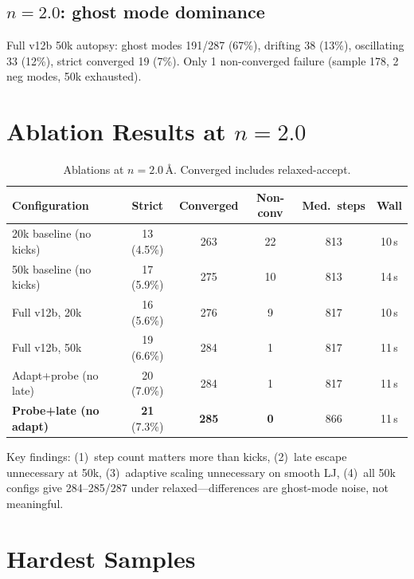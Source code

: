 \documentclass[11pt,a4paper]{article}
\theoremstyle{definition}
\begin{document}
\subsection{$n{=}2.0$: ghost mode dominance}

Full v12b 50k autopsy: ghost modes 191/287 (67\%), drifting 38 (13\%),
oscillating 33 (12\%), strict converged 19 (7\%).
Only 1 non-converged failure (sample 178, 2 neg modes, 50k exhausted).

\section{Ablation Results at $n{=}2.0$}
\label{app:ablations}

\begin{table}[h]
\centering\small
\caption{Ablations at $n{=}2.0$\,\AA.  Converged includes relaxed-accept.}
\begin{tabular}{lccccc}
\toprule
Configuration & Strict & Converged & Non-conv & Med.\ steps & Wall \\
\midrule
20k baseline (no kicks) & 13 (4.5\%) & 263 & 22 & 813 & 10\,s \\
50k baseline (no kicks) & 17 (5.9\%) & 275 & 10 & 813 & 14\,s \\
\midrule
Full v12b, 20k          & 16 (5.6\%) & 276 & 9 & 817 & 10\,s \\
Full v12b, 50k          & 19 (6.6\%) & 284 & 1 & 817 & 11\,s \\
Adapt+probe (no late)   & 20 (7.0\%) & 284 & 1 & 817 & 11\,s \\
\textbf{Probe+late (no adapt)} & \textbf{21} (7.3\%) & \textbf{285} & \textbf{0} & 866 & 11\,s \\
\bottomrule
\end{tabular}
\end{table}

Key findings: (1)~step count matters more than kicks, (2)~late escape
unnecessary at 50k, (3)~adaptive scaling unnecessary on smooth LJ,
(4)~all 50k configs give 284--285/287 under relaxed---differences are
ghost-mode noise, not meaningful.

\section{Hardest Samples}
\label{app:hardest}
\end{document}

